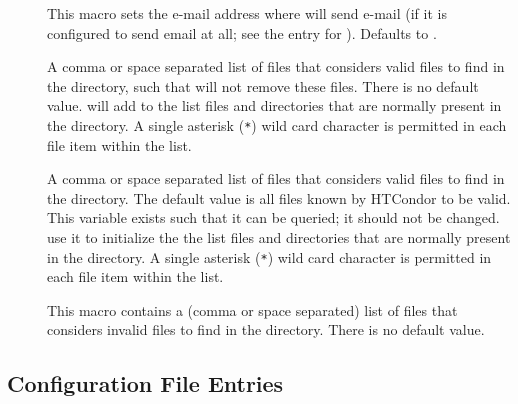 \begin{description}

\item[]
\label{param:PreenAdmin}
  This macro sets the e-mail address where  will send e-mail
  (if it is configured to send email at all; see the entry for ).
  Defaults to .

\label{param:ValidSpoolFiles}
\item[]
  A comma or space separated list of files that
   considers valid files to find in the 
  directory, such that  will not remove these files.
  There is no default value.  will add to the
  list files and directories that are normally present in the
   directory.
  A single asterisk (\verb|*|) wild card character is permitted in each 
  file item within the list.

\label{param:SystemValidSpoolFiles}
\item[]
  A comma or space separated list of files that
   considers valid files to find in the 
  directory. The default value is all files known by HTCondor to be valid.
  This variable exists such that it can be queried; it should not be changed.
   use it to initialize the the list files and directories
  that are normally present in the
   directory.
  A single asterisk (\verb|*|) wild card character is permitted in each 
  file item within the list.

\label{param:InvalidLogFiles}
\item[]
  This macro contains a (comma or space separated) list of files that
   considers invalid files to find in the 
  directory.  There is no default value.

\end{description}


\subsection{\label{sec:Collector-Config-File-Entries}
Configuration File Entries}

